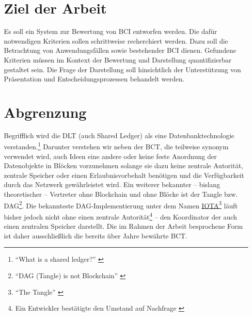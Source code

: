 \section{Ziel der Arbeit}


Es soll ein System zur Bewertung von \gls{BCI} entworfen werden.
Die dafür notwendigen Kriterien sollen schrittweise recherchiert werden.
Dazu soll die Betrachtung von Anwendungsfällen sowie bestehender \gls{BCI} dienen.
Gefundene Kriterien müssen im Kontext der Bewertung und Darstellung quantifizierbar gestaltet sein.
Die Frage der Darstellung soll hinsichtlich der Unterstützung von Präsentation und Entscheidungsprozessen behandelt werden.


\section{Abgrenzung}\label{sec:abgrenzung}

Begrifflich wird die \gls{DLT} (auch Shared Ledger) als eine Datenbanktechnologie verstanden.\footnote{\enquote{What is a shared ledger?} \autocite{b:gos-dlt}}
Darunter verstehen wir neben der \gls{BCT}, die teilweise synonym verwendet wird, auch Ideen eine andere oder keine feste Anordnung der Datenobjekte in Blöcken vorzunehmen solange sie dazu keine zentrale Autorität, zentrale Speicher oder einen Erlaubnisvorbehalt benötigen und die Verfügbarkeit durch das Netzwerk gewährleistet wird.
Ein weiterer bekannter -- bislang theoretischer -- Vertreter ohne Blockchain und ohne Blöcke ist der Tangle bzw. \gls{DAG}\footnote{\enquote{DAG (Tangle) is not Blockchain} \autocite{w:satoshiwatch-dag}}.
Die bekannteste \gls{DAG}-Implementierung unter dem Namen \href{https://iota.org/}{IOTA}\footnote{\enquote{The Tangle} \autocite{p:iota}} läuft bisher jedoch nicht ohne einen zentrale Autorität\footnote{Ein Entwickler bestätigte den Umstand auf Nachfrage \autocite{w:iota-centralized}} -- den Koordinator der auch einen zentralen Speicher darstellt.
Die im Rahmen der Arbeit besprochene Form ist daher ausschließlich die bereits über Jahre bewährte \gls{BCT}.

